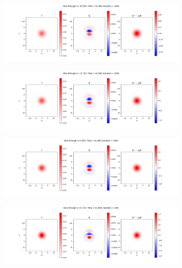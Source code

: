 \documentclass{article}
\begin{document}
\begin{figure}[H]
  \begin{subfigure}[b]{\textwidth}
    \includegraphics[width=\textwidth]{imgs/ts_output2/slice0/mat1000.png}
  \end{subfigure}
  \hfill
  \begin{subfigure}[b]{\textwidth}
    \includegraphics[width=\textwidth]{imgs/ts_output2/slice25/mat1000.png}
  \end{subfigure}
  \hfill
  \begin{subfigure}[b]{\textwidth}
    \includegraphics[width=\textwidth]{imgs/ts_output2/slice50/mat1000.png}
  \end{subfigure}
  \hfill
  \begin{subfigure}[b]{\textwidth}
    \includegraphics[width=\textwidth]{imgs/ts_output2/slice75/mat1000.png}
  \end{subfigure}
\end{figure}
\end{document}
